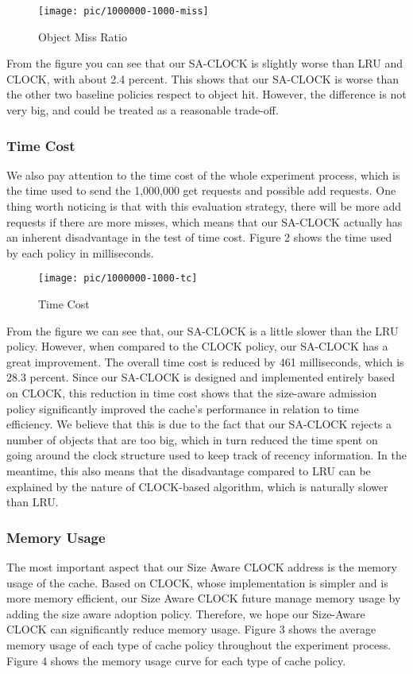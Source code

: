\documentclass[journal,10.5pt,onecolumn]{IEEEtran}
\begin{document}
\begin{figure}[h]
    \centering
    \texttt{[image: pic/1000000-1000-miss]}
    \caption{Object Miss Ratio}
\end{figure}

From the figure you can see that our SA-CLOCK is slightly worse than LRU and CLOCK, with about 2.4 percent. This shows that our SA-CLOCK is worse than the other two baseline policies respect to object hit. However, the difference is not very big, and could be treated as a reasonable trade-off. 

\subsubsection{Time Cost}
We also pay attention to the time cost of the whole experiment process, which is the time used to send the 1,000,000 get requests and possible add requests. One thing worth noticing is that with this evaluation strategy, there will be more add requests if there are more misses, which means that our SA-CLOCK actually has an inherent disadvantage in the test of time cost. Figure 2 shows the time used by each policy in milliseconds.

\begin{figure}[h]
    \centering
    \texttt{[image: pic/1000000-1000-tc]}
    \caption{Time Cost}
\end{figure}

From the figure we can see that, our SA-CLOCK is a little slower than the LRU policy. However, when compared to the CLOCK policy, our SA-CLOCK has a great improvement. The overall time cost is reduced by 461 milliseconds, which is 28.3 percent. Since our SA-CLOCK is designed and implemented entirely based on CLOCK, this reduction in time cost shows that the size-aware admission policy significantly improved the cache's performance in relation to time efficiency. We believe that this is due to the fact that our SA-CLOCK rejects a number of objects that are too big, which in turn reduced the time spent on going around the clock structure used to keep track of recency information. In the meantime, this also means that the disadvantage compared to LRU can be explained by the nature of CLOCK-based algorithm, which is naturally slower than LRU.


\subsubsection{Memory Usage}
The most important aspect that our Size Aware CLOCK address is the memory usage of the cache. Based on CLOCK, whose implementation is simpler and is more memory efficient, our Size Aware CLOCK future manage memory usage by adding the size aware adoption policy. Therefore, we hope our Size-Aware CLOCK can significantly reduce memory usage. Figure 3 shows the average memory usage of each type of cache policy throughout the experiment process. Figure 4 shows the memory usage curve for each type of cache policy.
\end{document}

